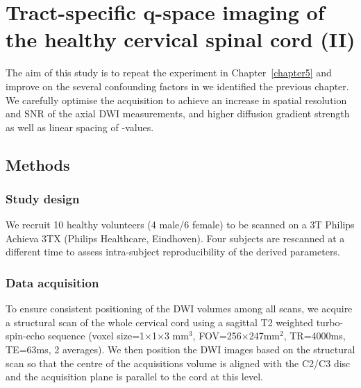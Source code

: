 \chapter{Tract-specific q-space imaging of the healthy cervical spinal cord (II)}
\label{chapter6}
\glsresetall %
The aim of this study is to repeat the experiment in Chapter~\ref{chapter5} and improve on the several confounding factors in we identified the previous chapter. We carefully optimise the acquisition to achieve an increase in spatial resolution and \gls{SNR} of the axial \gls{DWI} measurements, and higher diffusion gradient strength as well as linear spacing of {\q}-values.

\section{Methods}
\subsection{Study design}
We recruit 10 healthy volunteers (4 male/6 female) to be scanned on a 3T Philips Achieva 3TX (Philips Healthcare, Eindhoven). Four subjects are rescanned at a different time  to assess intra-subject reproducibility of the derived parameters.
\subsection{Data acquisition}
To ensure consistent positioning of the \gls{DWI} volumes among all scans, we acquire a structural scan of the whole cervical cord using a sagittal T2 weighted turbo-spin-echo sequence (voxel size=1$\times$1$\times$3 mm$^3$, FOV=256$\times$247mm$^2$, TR=4000ms, TE=63ms, 2 averages). We then position the \gls{DWI} images based on the structural scan so that the centre of the acquisitions volume is aligned with the C2/C3 disc and the acquisition plane is parallel to the cord at this level.

